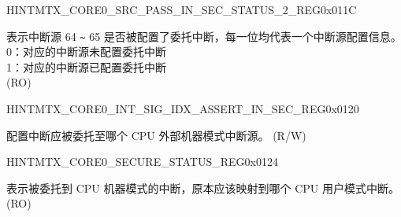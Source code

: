 \begin{register}{H}{INTMTX\_CORE0\_SRC\_PASS\_IN\_SEC\_STATUS\_2\_REG}{0x011C}\label{regdesc:INTMTXCORE0SRCPASSINSECSTATUS2REG}
%
%
\regnewline%
\begin{regdesc}\begin{reglist}
\label{fielddesc:INTMTXCORE0INTSRCPASSINSECSTATUS2}\item [INTMTX\_CORE0\_INT\_SRC\_PASS\_IN\_SEC\_STATUS\_2] 表示中断源 64 \verb+~+ 65 是否被配置了委托中断，每一位均代表一个中断源配置信息。\\

0：对应的中断源未配置委托中断\\
1：对应的中断源已配置委托中断\\ (RO)
\end{reglist}\end{regdesc}
\end{register}


\begin{register}{H}{INTMTX\_CORE0\_INT\_SIG\_IDX\_ASSERT\_IN\_SEC\_REG}{0x0120}\label{regdesc:INTMTXCORE0INTSIGIDXASSERTINSECREG}
%
%
\regnewline%
\begin{regdesc}\begin{reglist}
\label{fielddesc:INTMTXCORE0INTSIGIDXASSERTINSEC}\item [INTMTX\_CORE0\_INT\_SIG\_IDX\_ASSERT\_IN\_SEC] 配置中断应被委托至哪个 CPU 外部机器模式中断源。 (R/W)
\end{reglist}\end{regdesc}
\end{register}


\begin{register}{H}{INTMTX\_CORE0\_SECURE\_STATUS\_REG}{0x0124}\label{regdesc:INTMTXCORE0SECURESTATUSREG}
%
\regnewline%
\begin{regdesc}\begin{reglist}
\label{fielddesc:INTMTXCORE0INTSECURESTATUS}\item [INTMTX\_CORE0\_INT\_SECURE\_STATUS] 表示被委托到 CPU 机器模式的中断，原本应该映射到哪个 CPU 用户模式中断。 (RO)
\end{reglist}\end{regdesc}
\end{register}


